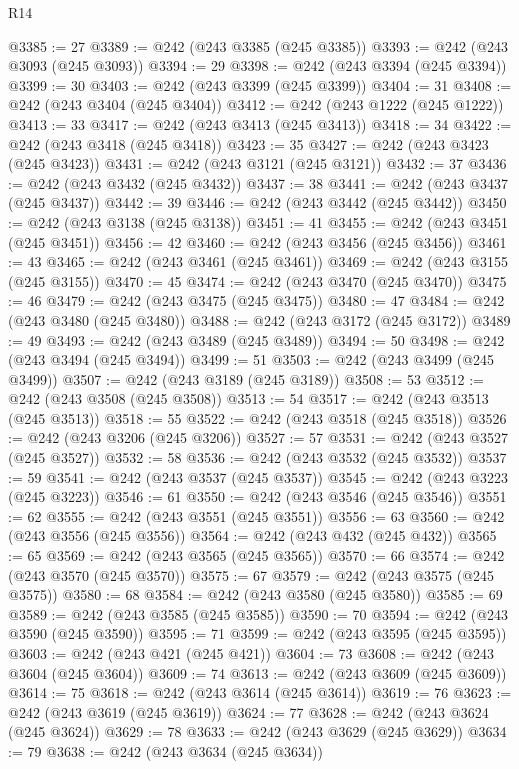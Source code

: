 \begin{lexlean}{R14}
\begin{coremodule}
{{{{{{{{{{{{{{{{{{{{{{{{{{{{{{{{{{{{{{{{{{{{{{{{{{{{{{{{{{{{{{{{{{{{{{{{{{{{{{{{{{@3385 := 27
@3389 := @242 (@243 @3385 (@245 @3385))
@3393 := @242 (@243 @3093 (@245 @3093))
@3394 := 29
@3398 := @242 (@243 @3394 (@245 @3394))
@3399 := 30
@3403 := @242 (@243 @3399 (@245 @3399))
@3404 := 31
@3408 := @242 (@243 @3404 (@245 @3404))
@3412 := @242 (@243 @1222 (@245 @1222))
@3413 := 33
@3417 := @242 (@243 @3413 (@245 @3413))
@3418 := 34
@3422 := @242 (@243 @3418 (@245 @3418))
@3423 := 35
@3427 := @242 (@243 @3423 (@245 @3423))
@3431 := @242 (@243 @3121 (@245 @3121))
@3432 := 37
@3436 := @242 (@243 @3432 (@245 @3432))
@3437 := 38
@3441 := @242 (@243 @3437 (@245 @3437))
@3442 := 39
@3446 := @242 (@243 @3442 (@245 @3442))
@3450 := @242 (@243 @3138 (@245 @3138))
@3451 := 41
@3455 := @242 (@243 @3451 (@245 @3451))
@3456 := 42
@3460 := @242 (@243 @3456 (@245 @3456))
@3461 := 43
@3465 := @242 (@243 @3461 (@245 @3461))
@3469 := @242 (@243 @3155 (@245 @3155))
@3470 := 45
@3474 := @242 (@243 @3470 (@245 @3470))
@3475 := 46
@3479 := @242 (@243 @3475 (@245 @3475))
@3480 := 47
@3484 := @242 (@243 @3480 (@245 @3480))
@3488 := @242 (@243 @3172 (@245 @3172))
@3489 := 49
@3493 := @242 (@243 @3489 (@245 @3489))
@3494 := 50
@3498 := @242 (@243 @3494 (@245 @3494))
@3499 := 51
@3503 := @242 (@243 @3499 (@245 @3499))
@3507 := @242 (@243 @3189 (@245 @3189))
@3508 := 53
@3512 := @242 (@243 @3508 (@245 @3508))
@3513 := 54
@3517 := @242 (@243 @3513 (@245 @3513))
@3518 := 55
@3522 := @242 (@243 @3518 (@245 @3518))
@3526 := @242 (@243 @3206 (@245 @3206))
@3527 := 57
@3531 := @242 (@243 @3527 (@245 @3527))
@3532 := 58
@3536 := @242 (@243 @3532 (@245 @3532))
@3537 := 59
@3541 := @242 (@243 @3537 (@245 @3537))
@3545 := @242 (@243 @3223 (@245 @3223))
@3546 := 61
@3550 := @242 (@243 @3546 (@245 @3546))
@3551 := 62
@3555 := @242 (@243 @3551 (@245 @3551))
@3556 := 63
@3560 := @242 (@243 @3556 (@245 @3556))
@3564 := @242 (@243 @432 (@245 @432))
@3565 := 65
@3569 := @242 (@243 @3565 (@245 @3565))
@3570 := 66
@3574 := @242 (@243 @3570 (@245 @3570))
@3575 := 67
@3579 := @242 (@243 @3575 (@245 @3575))
@3580 := 68
@3584 := @242 (@243 @3580 (@245 @3580))
@3585 := 69
@3589 := @242 (@243 @3585 (@245 @3585))
@3590 := 70
@3594 := @242 (@243 @3590 (@245 @3590))
@3595 := 71
@3599 := @242 (@243 @3595 (@245 @3595))
@3603 := @242 (@243 @421 (@245 @421))
@3604 := 73
@3608 := @242 (@243 @3604 (@245 @3604))
@3609 := 74
@3613 := @242 (@243 @3609 (@245 @3609))
@3614 := 75
@3618 := @242 (@243 @3614 (@245 @3614))
@3619 := 76
@3623 := @242 (@243 @3619 (@245 @3619))
@3624 := 77
@3628 := @242 (@243 @3624 (@245 @3624))
@3629 := 78
@3633 := @242 (@243 @3629 (@245 @3629))
@3634 := 79
@3638 := @242 (@243 @3634 (@245 @3634))
}}}}}}}}}}}}}}}}}}}}}}}}}}}}}}}}}}}}}}}}}}}}}}}}}}}}}}}}}}}}}}}}}}}}}}}}}}}}}}}}}}
\end{coremodule}
\end{lexlean}
